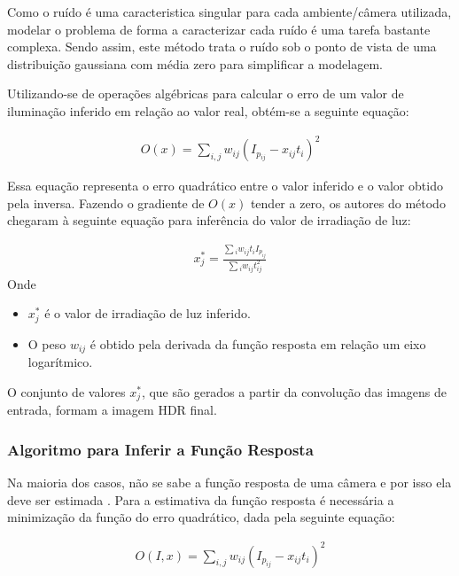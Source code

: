 Como o ruído é uma caracteristica singular para cada ambiente/câmera utilizada, modelar o problema de forma a caracterizar cada ruído é uma tarefa bastante complexa. Sendo assim, este método trata o ruído sob o ponto de vista de uma distribuição gaussiana com média zero para simplificar a modelagem.

Utilizando-se de operações algébricas para calcular o erro de um valor de iluminação inferido em relação ao valor real, obtém-se a seguinte equação:

\begin{align} \label{eqRobertsonErr}
	O(x) = \sum\limits_{i,j}{w_{ij}(I_{p_{ij}} - x_{ij}t_{i})^2}
\end{align}

Essa equação representa o erro quadrático entre o valor inferido e o valor obtido pela inversa. Fazendo o gradiente de $O(x)$ tender a zero, os autores do método chegaram à seguinte equação para inferência do valor de irradiação de luz:

\begin{align} \label{eqRobertsonGeracao}
	x^{*}_j = \frac{\sum{_i w_{ij}t_{i}I_{p_{ij}}}}{\sum{_i w_{ij}t_{ij}^{2}}}
\end{align}
Onde
\begin{itemize}
\item $x^{*}_j$ é o valor de irradiação de luz inferido.
\item O peso $w_{ij}$ é obtido pela derivada da função resposta em relação um eixo logarítmico. 
\end{itemize}

O conjunto de valores $x^{*}_j$, que são gerados a partir da convolução das imagens de entrada, formam a imagem HDR final.

\subsubsection{Algoritmo para Inferir a Função Resposta} \label{metodoRobertsonAlg}

Na maioria dos casos, não se sabe a função resposta de uma câmera e por isso ela deve ser estimada \cite{robertson}. Para a estimativa da função resposta é necessária a minimização da função do erro quadrático, dada pela seguinte equação:

\begin{align} \label{eqRobertsonErr2}
	O(I,x) = \sum\limits_{i,j}{w_{ij}(I_{p_{ij}} - x_{ij}t_{i})^2}
\end{align}

